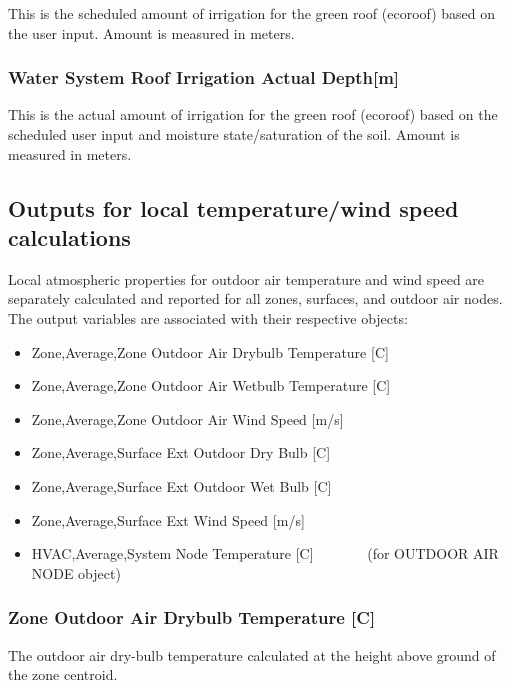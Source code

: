 This is the scheduled amount of irrigation for the green roof (ecoroof) based on the user input. Amount is measured in meters.

\subsubsection{Water System Roof Irrigation Actual Depth{[}m{]}}\label{water-system-roof-irrigation-actual-depthm}

This is the actual amount of irrigation for the green roof (ecoroof) based on the scheduled user input and moisture state/saturation of the soil. Amount is measured in meters.

\subsection{Outputs for local temperature/wind speed calculations}\label{outputs-for-local-temperaturewind-speed-calculations}

Local atmospheric properties for outdoor air temperature and wind speed are separately calculated and reported for all zones, surfaces, and outdoor air nodes. The output variables are associated with their respective objects:

\begin{itemize}
\item
  Zone,Average,Zone Outdoor Air Drybulb Temperature {[}C{]}
\item
  Zone,Average,Zone Outdoor Air Wetbulb Temperature {[}C{]}
\item
  Zone,Average,Zone Outdoor Air Wind Speed {[}m/s{]}
\item
  Zone,Average,Surface Ext Outdoor Dry Bulb {[}C{]}
\item
  Zone,Average,Surface Ext Outdoor Wet Bulb {[}C{]}
\item
  Zone,Average,Surface Ext Wind Speed {[}m/s{]}
\item
  HVAC,Average,System Node Temperature {[}C{]}~~~~~~~ (for OUTDOOR AIR NODE object)
\end{itemize}

\subsubsection{Zone Outdoor Air Drybulb Temperature {[}C{]}}\label{zone-outdoor-air-drybulb-temperature-c}

The outdoor air dry-bulb temperature calculated at the height above ground of the zone centroid.

